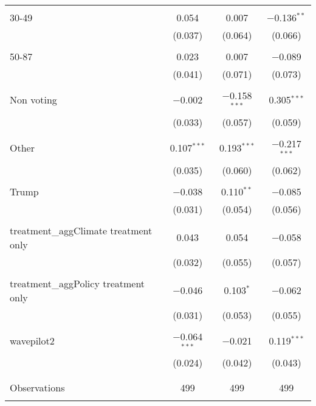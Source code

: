\begin{tabular}{@{\extracolsep{5pt}}lccc}
  & & & \\ 
 30-49 & 0.054 & 0.007 & $-$0.136$^{**}$ \\ 
  & (0.037) & (0.064) & (0.066) \\ 
  & & & \\ 
 50-87 & 0.023 & 0.007 & $-$0.089 \\ 
  & (0.041) & (0.071) & (0.073) \\ 
  & & & \\ 
 Non voting & $-$0.002 & $-$0.158$^{***}$ & 0.305$^{***}$ \\ 
  & (0.033) & (0.057) & (0.059) \\ 
  & & & \\ 
 Other & 0.107$^{***}$ & 0.193$^{***}$ & $-$0.217$^{***}$ \\ 
  & (0.035) & (0.060) & (0.062) \\ 
  & & & \\ 
 Trump & $-$0.038 & 0.110$^{**}$ & $-$0.085 \\ 
  & (0.031) & (0.054) & (0.056) \\ 
  & & & \\ 
 treatment\_aggClimate treatment only & 0.043 & 0.054 & $-$0.058 \\ 
  & (0.032) & (0.055) & (0.057) \\ 
  & & & \\ 
 treatment\_aggPolicy treatment only & $-$0.046 & 0.103$^{*}$ & $-$0.062 \\ 
  & (0.031) & (0.053) & (0.055) \\ 
  & & & \\ 
 wavepilot2 & $-$0.064$^{***}$ & $-$0.021 & 0.119$^{***}$ \\ 
  & (0.024) & (0.042) & (0.043) \\ 
  & & & \\ 
\hline \\[-1.8ex] 

Observations & 499 & 499 & 499 \\ 
\hline 
\hline \\[-1.8ex] 
\end{tabular} 